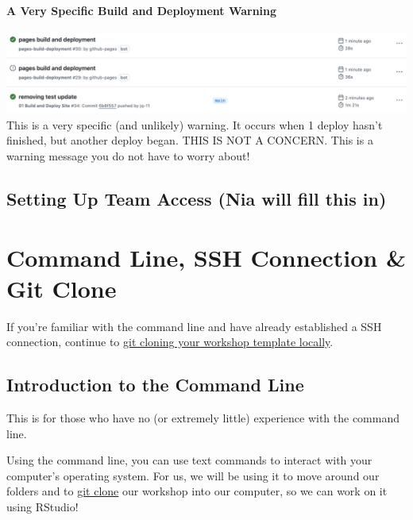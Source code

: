 \documentclass[
]{book}
\theoremstyle{definition}
\theoremstyle{definition}
\theoremstyle{definition}
\theoremstyle{definition}
\theoremstyle{remark}
\begin{document}
\subsubsection*{A Very Specific Build and Deployment Warning}\label{a-very-specific-build-and-deployment-warning}

\includegraphics{img/git-instruct/exclamation-point-deploy-warning.png}\\

This is a very specific (and unlikely) warning. It occurs when 1 deploy hasn't finished, but another deploy began. THIS IS NOT A CONCERN. This is a warning message you do not have to worry about!

\section{Setting Up Team Access (Nia will fill this in)}\label{setting-up-team-access-nia-will-fill-this-in}

\chapter{Command Line, SSH Connection \& Git Clone}\label{command-line-ssh-connection-git-clone}

If you're familiar with the command line and have already established a SSH connection, continue to \hyperref[git-clone]{git cloning your workshop template locally}.

\section{Introduction to the Command Line}\label{introduction-to-the-command-line}

This is for those who have no (or extremely little) experience with the command line.

Using the command line, you can use text commands to interact with your computer's operating system. For us, we will be using it to move around our folders and to \hyperref[git-clone]{git clone} our workshop into our computer, so we can work on it using RStudio!
\end{document}
